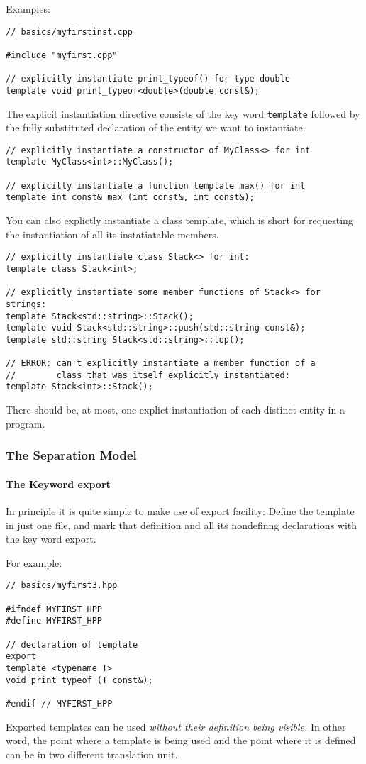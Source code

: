 \documentclass[11pt, a4paper]{book}
\begin{document}
Examples:
\begin{verbatim}
// basics/myfirstinst.cpp 

#include "myfirst.cpp" 

// explicitly instantiate print_typeof() for type double 
template void print_typeof<double>(double const&); 
\end{verbatim}
The explicit instantiation directive consists of the key word \verb|template| followed by the fully substituted declaration of the entity we want to instantiate.
\begin{verbatim}
// explicitly instantiate a constructor of MyClass<> for int 
template MyClass<int>::MyClass(); 

// explicitly instantiate a function template max() for int 
template int const& max (int const&, int const&); 
\end{verbatim}
You can also explictly instantiate a class template, which is short for requesting the instantiation of all its instatiatable members. 
\begin{verbatim}
// explicitly instantiate class Stack<> for int: 
template class Stack<int>; 

// explicitly instantiate some member functions of Stack<> for strings: 
template Stack<std::string>::Stack(); 
template void Stack<std::string>::push(std::string const&); 
template std::string Stack<std::string>::top(); 

// ERROR: can't explicitly instantiate a member function of a 
//        class that was itself explicitly instantiated: 
template Stack<int>::Stack(); 
\end{verbatim}
There should be, at most, one explict instantiation of each distinct entity in a program.
\subsubsection{The Separation Model}
\paragraph{The Keyword export}

In principle it is quite simple to make use of export facility: Define the template in just one file, and mark that definition and all its nondefinng declarations with the key word export. 

For example:
\begin{verbatim}
// basics/myfirst3.hpp 

#ifndef MYFIRST_HPP 
#define MYFIRST_HPP 

// declaration of template 
export 
template <typename T> 
void print_typeof (T const&); 

#endif // MYFIRST_HPP 
\end{verbatim}
Exported templates can be used \emph{without their definition being visible.} In other word, the point where a template is being used and the point where it is defined can be in two different translation unit. 
\end{document}
